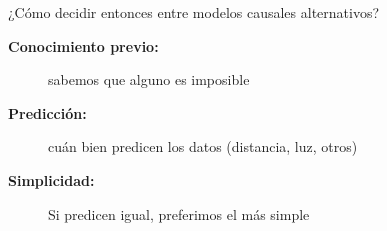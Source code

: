 \documentclass[shownotes,aspectratio=169]{beamer}
\begin{document}
\begin{frame}[plain]

\vspace{1.5cm}

 \begin{center}
 \Large ¿Cómo decidir entonces entre modelos causales alternativos?  
 \end{center}

 \vspace{0.5cm}
 \pause
 
 \begin{description}
 \item[\textbf{Conocimiento previo:}] sabemos que alguno es imposible \pause
 \item[\textbf{Predicción:}] cuán bien predicen los datos (distancia, luz, otros) \pause
 \item[\textbf{Simplicidad:}] Si predicen igual, preferimos el más simple 
 \end{description}
 
 
 
\end{frame}
\end{document}
